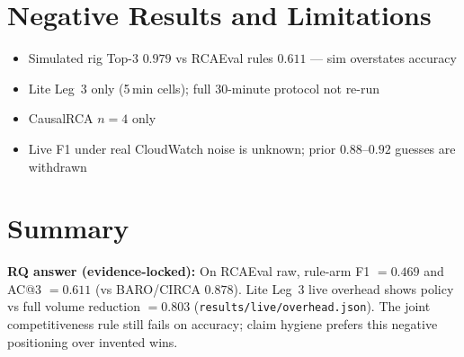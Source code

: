 \section{Negative Results and Limitations}

\begin{itemize}
    \item Simulated rig Top-3 $0.979$ vs RCAEval rules $0.611$ --- sim overstates accuracy
    \item Lite Leg~3 only (5\,min cells); full 30-minute protocol not re-run
    \item CausalRCA $n{=}4$ only
    \item Live F1 under real CloudWatch noise is unknown; prior $0.88$--$0.92$ guesses are withdrawn
\end{itemize}

\section{Summary}

\textbf{RQ answer (evidence-locked):} On RCAEval raw, rule-arm F1 $=0.469$ and AC@3 $=0.611$ (vs BARO/CIRCA $0.878$). Lite Leg~3 live overhead shows policy vs full volume reduction $=0.803$ (\texttt{results/live/overhead.json}). The joint competitiveness rule still fails on accuracy; claim hygiene prefers this negative positioning over invented wins.
